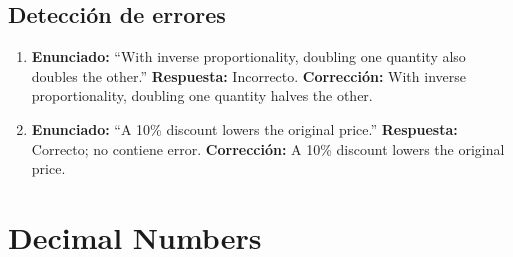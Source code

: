 \documentclass[11pt,a4paper]{article}
\begin{document}
\subsection{Detecci\'on de errores}
\begin{enumerate}
\item \textbf{Enunciado:} \textquotedblleft With inverse proportionality, doubling one quantity also doubles the other.\textquotedblright
\textbf{Respuesta:} Incorrecto.
\textbf{Correcci\'on:} With inverse proportionality, doubling one quantity halves the other.
\item \textbf{Enunciado:} \textquotedblleft A 10\% discount lowers the original price.\textquotedblright
\textbf{Respuesta:} Correcto; no contiene error.
\textbf{Correcci\'on:} A 10\% discount lowers the original price.
\end{enumerate}
\section{Decimal Numbers}
\end{document}
